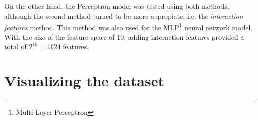 On the other hand, the Perceptron model was tested using both methods, although the 
second method turned to be more appropiate, i.e. the {\it interaction features} method. 
This method was also used for the MLP\footnote{Multi-Layer Perceptron} neural network 
model. With the size of the feature space of 10, adding interaction features 
provided a total of $2^{10}=1024$ features.

\section{Visualizing the dataset}

